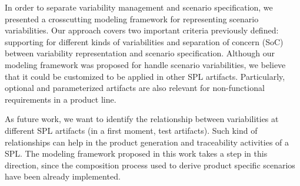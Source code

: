 \documentclass{acm_proc_article-sp}
\begin{document}
In order to separate variability management and scenario specification, 
we presented a crosscutting modeling framework for representing
scenario variabilities. Our approach covers two important criteria previously
defined: supporting for different kinds of variabilities and separation
of concern (SoC) between variability representation and scenario
specification. Although our modeling framework was proposed for handle 
scenario variabilities, we believe that it could be customized to be applied in 
other SPL artifacts. Particularly, optional and parameterized artifacts 
are also relevant for non-functional requirements in a product line.

As future work, we want to identify the relationship between
variabilities at different SPL artifacts (in a first moment, test
artifacts). Such kind of relationships can help in the product
generation and traceability activities of a SPL. The modeling
framework proposed in this work takes a step in this direction, since the 
composition process used to derive product specific scenarios have been already 
implemented.

%
%



\end{document}
